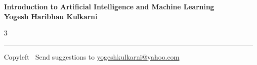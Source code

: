 \documentclass[8pt,landscape]{article}
\begin{document}
\footnotesize


\begin{center}
\Large{\textbf{Introduction to Artificial Intelligence and Machine Learning\\ Yogesh Haribhau Kulkarni}}
\end{center}

\begin{multicols}{3}

\end{multicols}

\rule{\linewidth}{0.25pt}
\scriptsize
Copyleft \textcopyleft\  Send suggestions to
\href{http://www.yogeshkulkarni.com}{yogeshkulkarni@yahoo.com}
\end{document}
